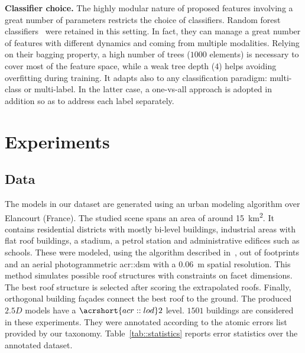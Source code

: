 \documentclass[runningheads]{llncs}
\begin{document}
\noindent
\textbf{Classifier choice.} The highly modular nature of proposed features involving a great number of parameters restricts the choice of classifiers. Random forest classifiers~\cite{breiman2001random} were retained in this setting. In fact, they can manage a great number of features with different dynamics and coming from multiple modalities. Relying on their bagging property, a high number of trees ($1000$ elements) is necessary to cover most of the feature space, while a weak tree depth ($4$) helps avoiding overfitting during training. It adapts also to any classification paradigm: multi-class or multi-label. In the latter case, a one-vs-all approach is adopted in addition so as to address each label separately.
\section{Experiments}
\subsection{Data}

The models in our dataset are generated using an urban modeling algorithm over Elancourt (France). The studied scene spans an area of around \SI{15}{\km\squared}. It contains residential districts with mostly bi-level buildings, industrial areas with flat roof buildings, a stadium, a petrol station and administrative edifices such as schools. These were modeled, using the algorithm described in~\cite{Durupt2006}, out of footprints and an aerial photogrammetric \acrshort{acr::dsm} with a \SI{0.06}{\m} spatial resolution. This method simulates possible roof structures with constraints on facet dimensions. The best roof structure is selected after scoring the extrapolated roofs. Finally, orthogonal building fa\c{c}ades connect the best roof to the ground. The produced $2.5D$ models have a $\acrshort{acr::lod}2$ level.  $1501$ buildings are considered in these experiments. They were annotated according to the atomic errors list provided by our taxonomy. Table~\ref{tab::statistics} reports error statistics over the annotated dataset.
\end{document}
